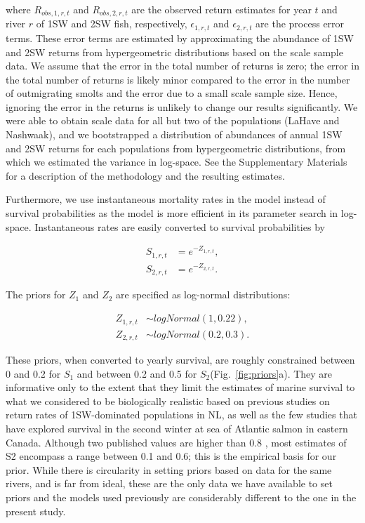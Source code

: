\documentclass[12pt]{article}
\newcommand{\So}{$S_{1}$\xspace}
\newcommand{\St}{$S_{2}$\xspace}
\begin{document}
where $R_{obs,1,r,t}$ and $R_{obs,2,r,t}$ are the observed return estimates
for year $t$ and river $r$ of 1SW and 2SW fish, respectively, $\epsilon_{1,r,t}$
and $\epsilon_{2,r,t}$ are the process error terms.
These error terms are estimated by approximating the abundance of 1SW and 2SW returns
from hypergeometric distributions based on the scale sample data.
We assume that the error in the total number of returns is zero;
the error in the total number of returns is likely minor
compared to the error in the number of outmigrating smolts and the error due to
a small scale sample size. Hence, ignoring the error in the returns is
unlikely to change our results significantly.
We were able to obtain scale data for all but two of the populations (LaHave and Nashwaak), and we
bootstrapped a distribution of abundances of annual 1SW and 2SW returns for each populations from hypergeometric distributions,
from which we estimated the variance in log-space.
See the Supplementary Materials for a description of the methodology and the resulting estimates.

Furthermore, we use instantaneous mortality rates in the model instead of
survival probabilities as the model is more efficient in its parameter search
in log-space. Instantaneous rates are easily converted to survival
probabilities by

\begin{align}
 S_{1,r,t} &= e^{-Z_{1,r,t}}, \\
 S_{2,r,t} &= e^{-Z_{2,r,t}}.
\end{align}

The priors for $Z_1$ and $Z_2$ are specified as log-normal distributions:

\begin{align}
Z_{1,r,t} &\sim logNormal(1, 0.22),   \\
Z_{2,r,t} &\sim logNormal(0.2, 0.3).
\end{align}

These priors, when converted to yearly survival, are roughly constrained between
0 and 0.2 for \So and between 0.2 and 0.5 for \St (Fig.~\ref{fig:priors}a). They are
informative only to the extent that they limit the estimates of marine survival
to what we considered to be biologically realistic based on previous studies on
return rates of 1SW-dominated populations in NL, as well as the few studies
that have explored survival in the second winter at sea of Atlantic salmon in
eastern Canada.
Although two published values are higher than 0.8 \citep{Chaput2003b,Hubley2011}, most estimates of S2 encompass a range between 0.1 and 0.6; this is the empirical basis for our prior.
While there is circularity in setting priors based on data for the same rivers,
and is far from ideal, these are the only data we have available to set priors
and the models used previously are considerably different to the one in the present study.
\end{document}
